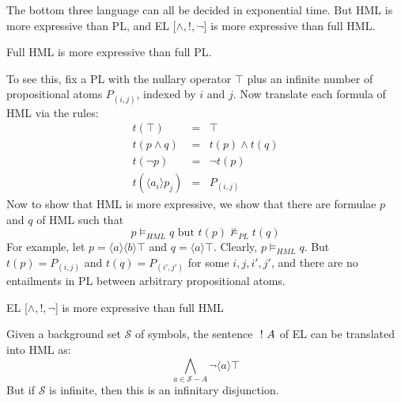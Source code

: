 The bottom three language can all be decided in exponential time.
But HML is more expressive than PL, and EL [$\land, !, \neg$]  is more expressive than full HML. 
\begin{proposition}
Full HML  is more expressive than full PL.
\end{proposition}
To see this, fix a PL with the nullary operator $\top$ plus an infinite number of propositional atoms $P_{(i,j)}$, indexed by $i$ and $j$.
Now translate each formula of HML via the rules:
\begin{eqnarray}
t(\top)  & = & \top \nonumber \\
t(p \land q) & = & t(p) \land t(q) \nonumber \\
t(\neg p) & = & \neg t(p)  \nonumber \\
t(\langle a_i \rangle p_j) & = & P_{(i,j)} \nonumber
\end{eqnarray}
Now to show that HML is more expressive, we show that there are formulae $p$ and $q$ of HML such that
\[
p \models_{HML} q \mbox{ but } t(p) \nvDash_{PL} t(q)
\]
For example, let $p = \langle a \rangle \langle b \rangle \top$ and $q = \langle a \rangle \top$.
Clearly, $p \models_{HML} q$. But $t(p) = P_{(i,j)}$ and $t(q) = P_{(i',j')}$ for some $i,j,i',j'$, and there are no entailments in PL between arbitrary propositional atoms.

\begin{proposition}
EL [$\land, !, \neg$]  is more expressive than full HML
\end{proposition}
Given a background set $\mathcal{S}$ of symbols, the sentence $\ ! \  A$ of EL can be translated into HML as:
\[
\bigwedge_{a \in \mathcal{S} - A} \neg \langle a \rangle \top
\]
But if $\mathcal{S}$ is infinite, then this is an infinitary disjunction.


